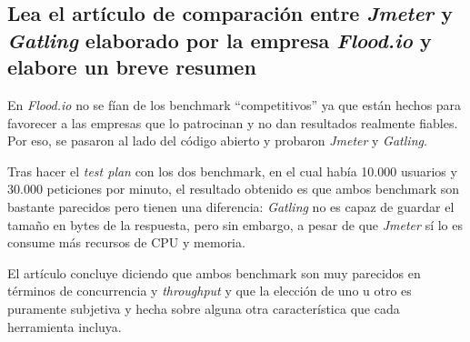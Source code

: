 \documentclass[10pt,a4paper,spanish]{article}
\numberwithin{equation}{section} %
\numberwithin{figure}{section} %
\numberwithin{table}{section} %
\begin{document}
\setcounter{subsection}{2}
\subsection{Lea el artículo de comparación entre \textit{Jmeter} y \textit{Gatling} elaborado por la empresa \textit{Flood.io} y elabore un breve resumen}
En \textit{Flood.io} no se fían de los benchmark ``competitivos'' ya que están hechos para favorecer a las empresas que lo patrocinan y no dan resultados realmente fiables. Por eso, se pasaron al lado del código abierto y probaron \textit{Jmeter} y \textit{Gatling}.

Tras hacer el \textit{test plan} con los dos benchmark, en el cual había 10.000 usuarios y 30.000 peticiones por minuto, el resultado obtenido es que ambos benchmark son bastante parecidos pero tienen una diferencia: \textit{Gatling} no es capaz de guardar el tamaño en bytes de la respuesta, pero sin embargo, a pesar de que \textit{Jmeter} sí lo es consume más recursos de CPU y memoria.

El artículo concluye diciendo que ambos benchmark son muy parecidos en términos de concurrencia y \textit{throughput} y que la elección de uno u otro es puramente subjetiva y hecha sobre alguna otra característica que cada herramienta incluya.


\end{document}
